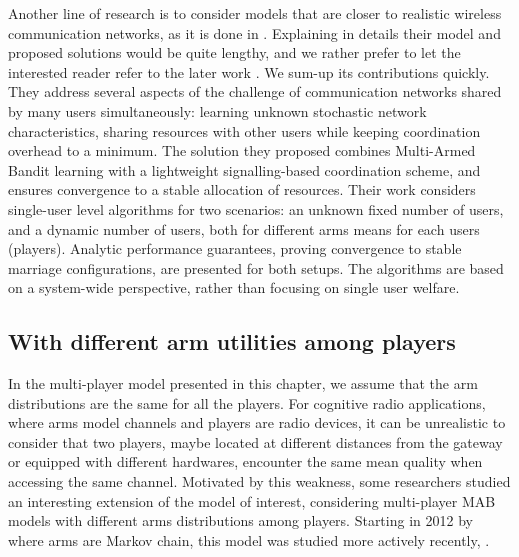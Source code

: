 Another line of research is to consider models that are closer to realistic wireless communication networks, as it is done in \cite{Avner16,AvnerMannor18}.
Explaining in details their model and proposed solutions would be quite lengthy, and we rather prefer to let the interested reader refer to the later work \cite{AvnerMannor18}.
We sum-up its contributions quickly.
They address several aspects of the challenge of communication networks shared by many users simultaneously: learning unknown stochastic network characteristics, sharing resources with other users while keeping coordination overhead to a minimum.
The solution they proposed combines Multi-Armed Bandit learning with a lightweight signalling-based coordination scheme, and ensures convergence to a stable allocation of resources.
Their work considers single-user level algorithms for two scenarios: an unknown fixed number of users, and a dynamic number of users, both for different arms means for each users (players).
Analytic performance guarantees, proving convergence to stable marriage configurations, are presented for both setups. The algorithms are based on a system-wide perspective, rather than focusing on single user welfare.



\subsection{With different arm utilities among players}
\label{sub:5:withDifferentMeansAmongPlayers}

In the multi-player model presented in this chapter, we assume that the arm distributions are the same for all the players.
For cognitive radio applications, where arms model channels and players are radio devices, it can be unrealistic to consider that two players, maybe located at different distances from the gateway or equipped with different hardwares, encounter the same mean quality when accessing the same channel.
%
Motivated by this weakness, some researchers studied an interesting extension of the model of interest, considering multi-player MAB models with different arms distributions among players.
%
Starting in 2012 by \cite{Kalathil12} where arms are Markov chain, this model was studied more actively recently, \cite{DarakHanawal18,Bistritz18,KaufmannAbbas19,Tibrewal2019}.

